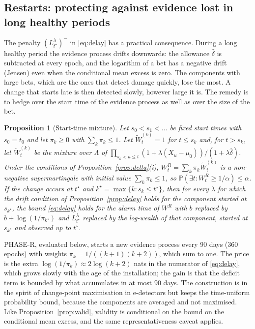 \documentclass[12pt,a4paper]{article}
\newenvironment{revblock}{}{}
\newenvironment{revblock}{\begingroup\color{revcol}}{\endgroup}
\newtheorem{proposition}{Proposition}
\newcommand{\Prob}{\mathbb{P}}
\begin{document}
\begin{revblock}
\subsection{Restarts: protecting against evidence lost in long healthy periods}\label{sec:restart}

The penalty $(L^\lambda_{t^\star})^-$ in \eqref{eq:delay} has a practical consequence. During a long healthy period the evidence process drifts downwards: the allowance $\hat\delta$ is subtracted at every epoch, and the logarithm of a bet has a negative drift (Jensen) even when the conditional mean excess is zero. The components with large bets, which are the ones that detect damage quickly, lose the most. A change that starts late is then detected slowly, however large it is. The remedy is to hedge over the start time of the evidence process as well as over the size of the bet.

\begin{proposition}[Start-time mixture]\label{prop:restart}
Let $s_0<s_1<\dots$ be fixed start times with $s_0=t_0$ and let $\pi_k\ge0$ with $\sum_k\pi_k\le1$. Let $\widetilde W^{(k)}_t=1$ for $t\le s_k$ and, for $t>s_k$, let $\widetilde W^{(k)}_t$ be the mixture over $\Lambda$ of $\prod_{s_k<u\le t}(1+\lambda(X_u-\mu_0))/(1+\lambda\hat\delta)$. Under the conditions of Proposition~\ref{prop:delta}(i), $W^R_t=\sum_k\pi_k\widetilde W^{(k)}_t$ is a non-negative supermartingale with initial value $\sum_k\pi_k\le1$, so $\Prob(\exists t:W^R_t\ge1/\alpha)\le\alpha$. If the change occurs at $t^\star$ and $k^\star=\max\{k:s_k\le t^\star\}$, then for every $\lambda$ for which the drift condition of Proposition~\ref{prop:delay} holds for the component started at $s_{k^\star}$, the bound \eqref{eq:delay} holds for the alarm time of $W^R$ with $b$ replaced by $b+\log(1/\pi_{k^\star})$ and $L^\lambda_{t^\star}$ replaced by the log-wealth of that component, started at $s_{k^\star}$ and observed up to $t^\star$.
\end{proposition}

PHASE-R, evaluated below, starts a new evidence process every 90 days (360 epochs) with weights $\pi_k=1/((k+1)(k+2))$, which sum to one. The price is the extra $\log(1/\pi_k)\approx2\log(k+2)$ nats in the numerator of \eqref{eq:delay}, which grows slowly with the age of the installation; the gain is that the deficit term is bounded by what accumulates in at most 90 days. The construction is in the spirit of change-point maximisation in e-detectors \citep{shin2023edetectors} but keeps the time-uniform probability bound, because the components are averaged and not maximised. Like Proposition~\ref{prop:valid}, validity is conditional on the bound on the conditional mean excess, and the same representativeness caveat applies.
\end{revblock}
\end{document}
